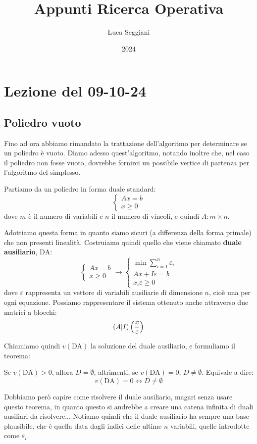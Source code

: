 \documentclass[a4paper,11pt]{article}
\title{Appunti Ricerca Operativa}
\author{Luca Seggiani}
\date{2024}
\begin{document}
\section{Lezione del 09-10-24}

\thispagestyle{empty}
\pagestyle{fancy}

\subsection{Poliedro vuoto}
Fino ad ora abbiamo rimandato la trattazione dell'algoritmo per determinare se un poliedro è vuoto.
Diamo adesso quest'algoritmo, notando inoltre che, nel caso il poliedro non fosse vuoto, dovrebbe fornirci un possibile vertice di partenza per l'algoritmo del simplesso.

Partiamo da un poliedro in forma duale standard:
\[
	\begin{cases}
		Ax = b \\
		x \geq 0
	\end{cases}
\]
dove $m$ è il numero di variabili e $n$ il numero di vincoli, e quindi $A: m \times n$.

Adottiamo questa forma in quanto siamo sicuri (a differenza della forma primale) che non presenti linealità.
Costruiamo quindi quello che viene chiamato \textbf{duale ausiliario}, $\text{DA}$:
\[
	\begin{cases}	
		Ax = b \\
		x \geq 0
	\end{cases}
	\rightarrow
	\begin{cases}
		\min \sum_{i=1}^n	\varepsilon_i \\ 
		Ax + I\varepsilon = b \\
		x_i \varepsilon \geq 0
	\end{cases}
\]
dove $\varepsilon$ rappresenta un vettore di variabili ausiliarie di dimensione $n$, cioè una per ogni equazione.
Possiamo rappresentare il sistema ottenuto anche attraverso due matrici a blocchi:
$$
\left( A | I \right) \left( x \over \varepsilon \right) 
$$

Chiamiamo quindi $v(\text{DA})$ la soluzione del duale ausiliario, e formuliamo il teorema:
\begin{theorem}{}
	Se $v(\text{DA}) > 0$, allora $D = \emptyset$, altrimenti, se $v(\text{DA}) = 0$, $D \neq \emptyset$.
	Equivale a dire:
	$$
	v(\text{DA}) = 0 \Leftrightarrow D \neq \emptyset
	$$
\end{theorem}

Dobbiamo però capire come risolvere il duale ausiliario, magari senza usare questo teorema, in quanto questo si andrebbe a creare una catena infinita di duali ausiliari da risolvere...
Notiamo quindi che il duale ausiliario ha sempre una base plausibile, che è quella data dagli indici delle ultime $n$ variabili, quelle introdotte come $\varepsilon_i$.
\end{document}

